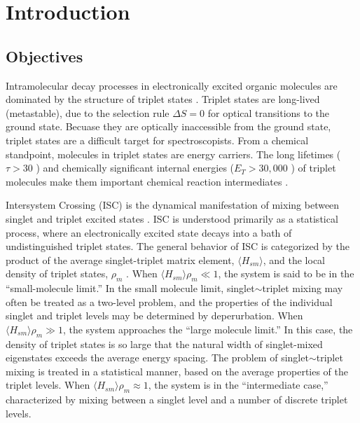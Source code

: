 \documentclass[12pt]{mitthesis}
\begin{document}
\tableofcontents
\clearpage

\chapter{Introduction}
\label{chapter:intro}

\section{Objectives}

Intramolecular decay processes in electronically excited organic
molecules are dominated by the structure of triplet states
\cite{mcglynn69, medvedev95}.  Triplet states are long-lived
(metastable), due to the selection rule $\Delta S = 0$ for optical
transitions to the ground state.  Becuase they are optically
inaccessible from the ground state, triplet states are a difficult
target for spectroscopists.  From a chemical standpoint, molecules in
triplet states are energy carriers.  The long lifetimes ($\tau > 30$
\microsec) and chemically significant internal energies ($E_T >
30,000$ \rcm) of triplet molecules make them important chemical
reaction intermediates \cite{calvert66}.

Intersystem Crossing (ISC) is the dynamical manifestation of mixing
between singlet and triplet excited states \cite{robinson67,
  kommandeur87, lombardi88, tramer05}.  ISC is understood primarily as
a statistical process, where an electronically excited state decays
into a bath of undistinguished triplet states.  The general behavior
of ISC is categorized by the product of the average singlet-triplet
matrix element, $\langle H_{sm} \rangle$, and the local density of
triplet states, $\rho_m$ \cite{robinson67, kommandeur87, freed76}.  When
$\langle H_{sm} \rangle \rho_m \ll 1$, the system is said to be in the
``small-molecule limit.''  In the small molecule limit,
singlet$\sim$triplet mixing may often be treated as a two-level
problem, and the properties of the individual singlet and triplet
levels may be determined by deperurbation.  When $\langle H_{sm}
\rangle \rho_m \gg 1$, the system approaches the ``large molecule
limit.''  In this case, the density of triplet states is so large that
the natural width of singlet-mixed eigenstates exceeds the average
energy spacing.  The problem of singlet$\sim$triplet mixing is treated
in a statistical manner, based on the average properties of the
triplet levels.  When $\langle H_{sm} \rangle \rho_m \approx 1$, the
system is in the ``intermediate case,'' characterized by mixing
between a singlet level and a number of discrete triplet levels.
\end{document}
